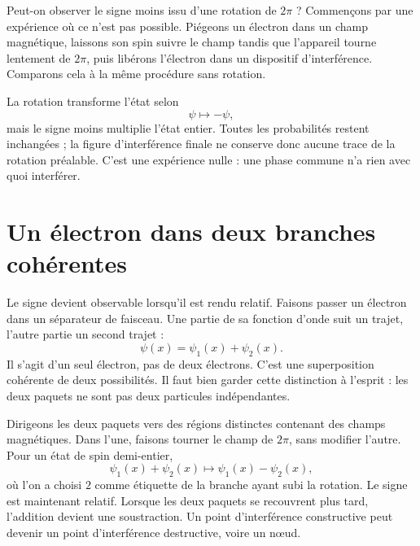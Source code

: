 Peut-on observer le signe moins issu d’une rotation de \(2\pi\) ? Commençons par une expérience où ce n’est pas possible. Piégeons un électron dans un champ magnétique, laissons son spin suivre le champ tandis que l’appareil tourne lentement de \(2\pi\), puis libérons l’électron dans un dispositif d’interférence. Comparons cela à la même procédure sans rotation.

La rotation transforme l’état selon
\begin{equation}
\psi\longmapsto-\psi,
\end{equation}
mais le signe moins multiplie l’état entier. Toutes les probabilités restent inchangées ; la figure d’interférence finale ne conserve donc aucune trace de la rotation préalable. C’est une expérience nulle : une phase commune n’a rien avec quoi interférer.

\begin{classroomqa}
\end{classroomqa}

\section{Un électron dans deux branches cohérentes}

Le signe devient observable lorsqu’il est rendu relatif. Faisons passer un électron dans un séparateur de faisceau. Une partie de sa fonction d’onde suit un trajet, l’autre partie un second trajet :
\begin{equation}
\psi(x)=\psi_1(x)+\psi_2(x).
\end{equation}
Il s’agit d’un seul électron, pas de deux électrons. C’est une superposition cohérente de deux possibilités. Il faut bien garder cette distinction à l’esprit : les deux paquets ne sont pas deux particules indépendantes.

Dirigeons les deux paquets vers des régions distinctes contenant des champs magnétiques. Dans l’une, faisons tourner le champ de \(2\pi\), sans modifier l’autre. Pour un état de spin demi-entier,
\begin{equation}
\psi_1(x)+\psi_2(x)
\longmapsto
\psi_1(x)-\psi_2(x),
\end{equation}
où l’on a choisi \(2\) comme étiquette de la branche ayant subi la rotation. Le signe est maintenant relatif. Lorsque les deux paquets se recouvrent plus tard, l’addition devient une soustraction. Un point d’interférence constructive peut devenir un point d’interférence destructive, voire un nœud.


